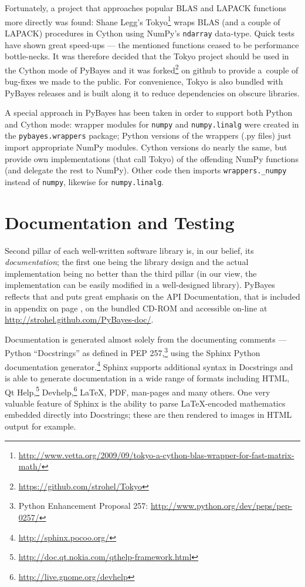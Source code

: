 Fortunately, a project that approaches popular BLAS and LAPACK functions more directly was found:
Shane Legg's Tokyo\footnote{\url{http://www.vetta.org/2009/09/tokyo-a-cython-blas-wrapper-for-fast-matrix-math/}}
wraps BLAS (and a couple of LAPACK) procedures in Cython using NumPy's \verb|ndarray| data-type.
Quick tests have shown great speed-ups --- the mentioned functions ceased to be performance
bottle-necks. It was therefore decided that the Tokyo project should be used in the Cython mode of
PyBayes and it was forked\footnote{\url{https://github.com/strohel/Tokyo}} on github to provide
a~couple of bug-fixes we made to the public. For convenience, Tokyo is also bundled with PyBayes
releases and is built along it to reduce dependencies on obscure libraries.

A special approach in PyBayes has been taken in order to support both Python and
Cython mode: wrapper modules for \verb|numpy| and \verb|numpy.linalg| were created in the
\verb|pybayes.wrappers| package; Python versions of the wrappers (.py files) just import appropriate
NumPy modules. Cython versions do nearly the same, but provide own implementations (that call Tokyo)
of the offending NumPy functions (and delegate the rest to NumPy). Other code then imports
\verb|wrappers._numpy| instead of \verb|numpy|, likewise for \verb|numpy.linalg|.

\section{Documentation and Testing} \label{sec:PyBayesDocsTests}

Second pillar of each well-written software library is, in our belief, its \emph{documentation}; the
first one being the library design and the actual implementation being no better than the third
pillar (in our view, the implementation can be easily modified in a well-designed library). PyBayes
reflects that and puts great emphasis on the API Documentation, that is
\ifattachements included in appendix on page \pageref{chap:APIDocs}, on the bundled CD-ROM and \fi
accessible on-line at \url{http://strohel.github.com/PyBayes-doc/}.

Documentation is generated almost solely from the documenting comments --- Python ``Docstrings'' as
defined in PEP 257,\footnote{Python Enhancement Proposal 257: \url{http://www.python.org/dev/peps/pep-0257/}}
using the Sphinx Python documentation generator.\footnote{\url{http://sphinx.pocoo.org/}} Sphinx
supports additional syntax in Docstrings and is able to generate documentation in a wide range of
formats including HTML, Qt Help,\footnote{\url{http://doc.qt.nokia.com/qthelp-framework.html}}
Devhelp,\footnote{\url{http://live.gnome.org/devhelp}} \LaTeX, PDF, man-pages and many others. One
very valuable feature of Sphinx is the ability to parse {\LaTeX}-encoded mathematics embedded
directly into Docstrings; these are then rendered to images in HTML output for example.

